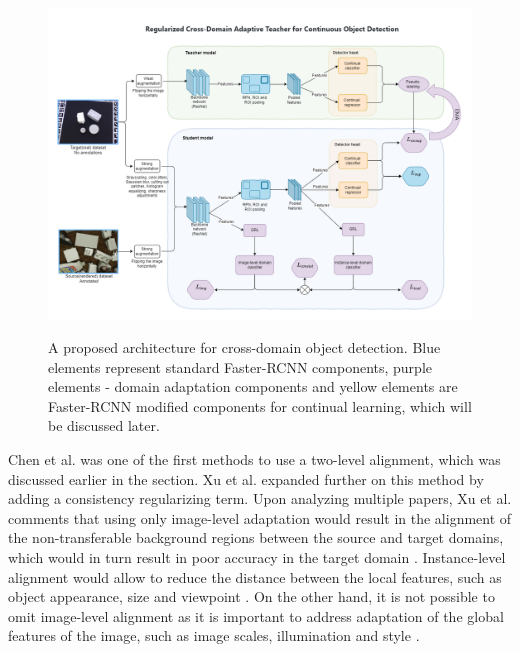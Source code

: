 \documentclass[english, 12pt, a4paper, elec, utf8, a-1b, online]{aaltothesis}
\begin{document}
\begin{figure}[htb]
	\begin{center}
		\includegraphics[width=16cm]{./MyModel.png}
	\end{center}
	\caption{A proposed architecture for cross-domain object detection. Blue elements represent standard Faster-RCNN components, purple elements - domain adaptation components and yellow elements are Faster-RCNN modified components for continual learning, which will be discussed later.}
	\begin{center}
		\label{mymodel}
	\end{center}
\end{figure}
\FloatBarrier

Chen et al. \cite{Chen2018} was one of the first methods to use a two-level alignment, which was discussed earlier in the  section. Xu et al. \cite{Xu2020} expanded further on this method by adding a consistency regularizing term. Upon analyzing multiple papers, Xu et al. comments that using only image-level adaptation would result in the alignment of the non-transferable background regions between the source and target domains, which would in turn result in poor accuracy in the target domain \cite{Xu2020}. Instance-level alignment would allow to reduce the distance between the local features, such as object appearance, size and viewpoint \cite{Chen2018}. On the other hand, it is not possible to omit image-level alignment as it is important to address adaptation of the global features of the image, such as image scales, illumination and style \cite{Chen2018}. 
\end{document}
